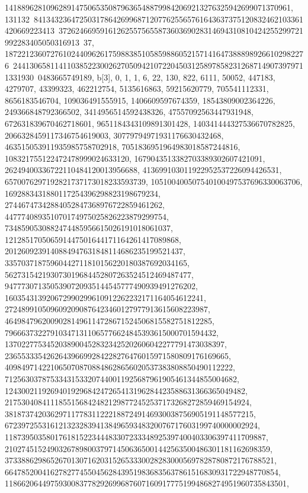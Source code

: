 {{{141889628109628914750653508796365488799842069213276325942699071370961, 131132\
84134323647250317864269968712077625565761643637375120832462103361420669223413\
37262466959161262557565587360369028314694310810424255299721992283405050316913\
37, 1872212360727610244096261759883851058598860521571416473888989266102982276\
24413065811411038522300262705094210722045031258978582312687149073979711331930\
0483665749189}}, {b[3], {0, 1, 1, 6, 22, 130, 822, 6111, 50052, 447183, 
   4279707, 43399323, 462212754, 5135616863, 59215620779, 705541112331, 
   8656183546704, 109036491555915, 1406609597674359, 18543809002364226, 
   249366848792366502, 3414956514592438326, 47557092563447931948, 
   672631839670462718601, 9651184343109891301428, 140341444327536670782825, 
   2066328459117346754619003, 30779794971931176630432468, 
   463515053911935985758702918, 7051836951964983018587244816, 
   108321755122472478999024633120, 1679043513382703389302607421091, 
   26249400336722110484120013956688, 413699103011922952537226094426531, 
   6570076297192821737173018233593739, 105100400507540100497537696330063706, 
   1692883431880117254396298823198679234, 
   27446747342884052847368976722859461262, 
   447774089351070174975025826223879299754, 
   7348590530882474485956615026191018061037, 
   121285170506591447501644171164261417089868, 
   2012609239140884947631848114686235199521437, 
   33570371875960442711810156220180387692034165, 
   562731542193073019684452807263524512469487477, 
   9477730713505390720935144545777490939491276202, 
   160354313920672990299610912262232171164054612241, 
   2724899105096092090876423460127977913615608223987, 
   46498479620090281496114728671524506815582751812285, 
   796663732279103471311065776624845393615000701594432, 
   13702277534520389004528323425202606042277791473038397, 
   236553335426264396699284228276476015971580809176169665, 
   4098497142210650708708848628656020537383808850490112222, 
   71256303787533431533207440011925687961905461344855004682, 
   1243002119269401929684247265413196284423588631366365049482, 
   21753040841118551568424821298772452537173268272859469154924, 
   381873742036297117783112221887249146930038756905191148577215, 
   6723972553161213232839413849659348320076717603199740000002924, 
   118739503580176181522344483307233348925397400403306397411709887, 
   2102745152490326789800379714506365001442563500486301181162698359, 
   37338862986526701307162031526533300282830005697828780872176788521, 
   664785200416278277455045628439519836835637861516830931722948770854, 
   11866206449759300837782926996876071609177751994868274951960735843501, 
}}}
